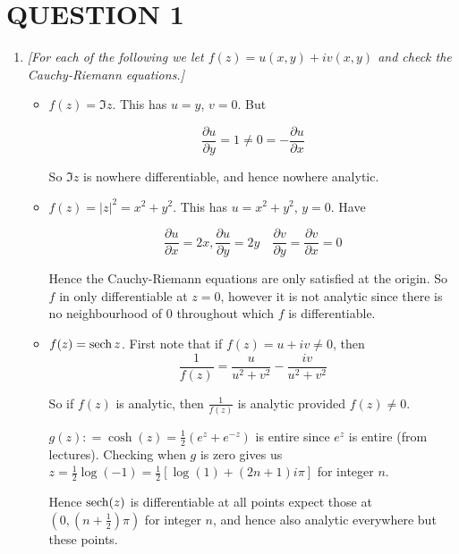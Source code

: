 \documentclass[a4paper]{article}
\begin{document}
	
\maketitle

\section{QUESTION 1}

\begin{enumerate}
	\item \emph{[For each of the following we let $ f(z) = u(x,y) + iv(x,y) $ and check the Cauchy-Riemann equations.] }
	
	\begin{itemize}
		\item $ f(z) = \Im z$. This has $ u = y $, $ v = 0 $. But
		
		\[ \frac{\partial u }{\partial y} = 1 \neq 0 = - \frac{\partial u }{\partial x} \]
		
		So $ \Im z $ is nowhere differentiable, and hence nowhere analytic.
		
		\item $ f(z) = | z |^{2} = x^{2} + y^{2} $. This has $ u = x^{2} + y^{2} $, $ y = 0 $. Have
		
		\[ \frac{\partial u }{\partial x} = 2x, \frac{\partial u }{\partial y} = 2y \quad \frac{\partial v }{\partial y} = \frac{\partial v }{\partial x} = 0  \]
		
		Hence the Cauchy-Riemann equations are only satisfied at the origin. So $ f $ in only differentiable at $ z = 0 $, however it is not analytic since there is no neighbourhood of 0 throughout which $ f $ is differentiable.
		
		\item $ f(z) = \operatorname{sech} z $. First note that if $ f(z) = u + iv \neq 0 $, then \[ \frac{1}{f(z)} = \frac{u}{u^{2} + v^{2}} - \frac{iv}{u^{2} + v^{2}} \] 
		
		So if $ f(z) $ is analytic, then $ \frac{1}{f(z)} $ is analytic provided $ f(z) \neq 0 $. 
		
		
		$ g(z) : = \cosh(z) = \frac{1}{2} (e^{z} + e^{-z}) $ is entire since $ e^{z} $ is entire (from lectures). Checking when $ g $ is zero gives us $ z = \frac{1}{2} \log(-1) = \frac{1}{2} \left[ \log(1) + (2 n + 1) i \pi \right] $ for integer $ n $.
		
		Hence $ \operatorname{sech} (z) $ is differentiable at all points expect those at $ (0,(n + \frac{1}{2}) \pi) $ for integer $ n $, and hence also analytic everywhere but these points. 
	\end{itemize}
	

\end{enumerate}
\end{document}
